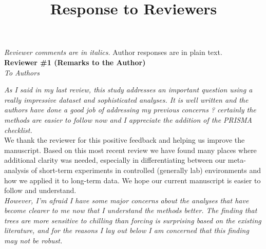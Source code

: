 \documentclass[11pt, a4paper]{article}
\newcommand{\lr}[1]{line~\lineref{#1}}
\begin{document}
{}


\setlength\parindent{0pt}


\title{Response to Reviewers}
\emph{Reviewer comments are in italics.} Author responses are in plain text.\\

{\bf Reviewer \#1 (Remarks to the Author)}\\

\emph{To Authors}

\emph{As I said in my last review, this study addresses an important question using a really impressive
dataset and sophisticated analyses. It is well written and the authors have done a good job of
addressing my previous concerns ? certainly the methods are easier to follow now and I appreciate
the addition of the PRISMA checklist.}\\

We thank the reviewer for this positive feedback and helping us improve the manuscript. Based on this most recent review we have found many places where additional clarity was needed, especially in differentiating between our meta-analysis of short-term experiments in controlled (generally lab) environments and how we applied it to long-term data. We hope our current manuscript is easier to follow and understand.\\

\emph{However, I'm afraid I have some major concerns about the analyses that have become clearer to me
now that I understand the methods better. The finding that trees are more sensitive to chilling than
forcing is surprising based on the existing literature, and for the reasons I lay out below I am
concerned that this finding may not be robust.}\\
\end{document}
